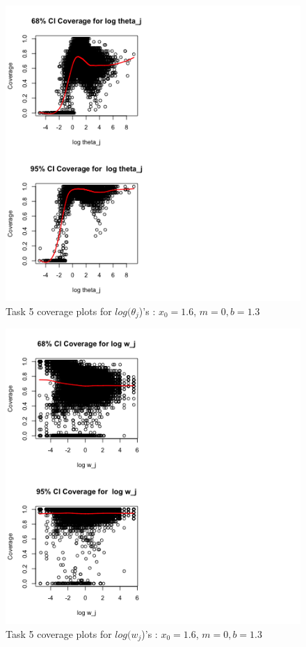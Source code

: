 \documentclass[paper=a4, fontsize=11pt]{scrartcl}
\begin{document}
\begin{figure}[h!]
  \caption{Task 5 coverage plots for $log(\theta_{j}$)'s : $x_0 = 1.6$, $m = 0, b = 1.3$}
  \centering
	\includegraphics[scale=1, trim = 0 0 200 0]{keskici_wxiao_ps2_task5_plot1.png}
\end{figure}

\begin{figure}[h!]
  \caption{Task 5 coverage plots for $log(w_{j}$)'s : $x_0 = 1.6$, $m = 0, b = 1.3$}
  \centering
	\includegraphics[scale=1, trim = 0 0 200 0]{keskici_wxiao_ps2_task5_plot2.png}
\end{figure}
\end{document}
